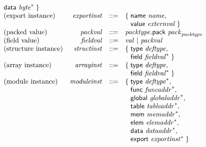 $$\begin{array}{@{}lrrl@{}l@{}}
\begin{array}[t]{@{}l@{}l@{}}
\mathsf{data}~{{\mathit{byte}}^\ast} \;\}\end{array} \\
\mbox{(export instance)} & {\mathit{exportinst}} &::=& \{\; \begin{array}[t]{@{}l@{}l@{}}
\mathsf{name}~{\mathit{name}},\; \\
  \mathsf{value}~{\mathit{externval}} \;\}\end{array} \\
\mbox{(packed value)} & {\mathit{packval}} &::=& {\mathit{packtype}}.\mathsf{pack}~{{\mathit{pack}}}_{{\mathit{packtype}}} \\
\mbox{(field value)} & {\mathit{fieldval}} &::=& {\mathit{val}} ~|~ {\mathit{packval}} \\
\mbox{(structure instance)} & {\mathit{structinst}} &::=& \{\; \begin{array}[t]{@{}l@{}l@{}}
\mathsf{type}~{\mathit{deftype}},\; \\
  \mathsf{field}~{{\mathit{fieldval}}^\ast} \;\}\end{array} \\
\mbox{(array instance)} & {\mathit{arrayinst}} &::=& \{\; \begin{array}[t]{@{}l@{}l@{}}
\mathsf{type}~{\mathit{deftype}},\; \\
  \mathsf{field}~{{\mathit{fieldval}}^\ast} \;\}\end{array} \\
\mbox{(module instance)} & {\mathit{moduleinst}} &::=& \{\; \begin{array}[t]{@{}l@{}l@{}}
\mathsf{type}~{{\mathit{deftype}}^\ast},\; \\
  \mathsf{func}~{{\mathit{funcaddr}}^\ast},\; \\
  \mathsf{global}~{{\mathit{globaladdr}}^\ast},\; \\
  \mathsf{table}~{{\mathit{tableaddr}}^\ast},\; \\
  \mathsf{mem}~{{\mathit{memaddr}}^\ast},\; \\
  \mathsf{elem}~{{\mathit{elemaddr}}^\ast},\; \\
  \mathsf{data}~{{\mathit{dataaddr}}^\ast},\; \\
  \mathsf{export}~{{\mathit{exportinst}}^\ast} \;\}\end{array} \\
\end{array}
$$

\vspace{1ex}

